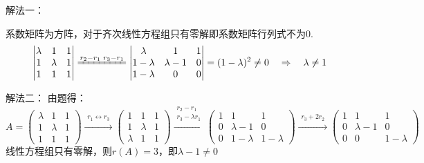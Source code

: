 \documentclass[a4paper]{report}
\begin{document}
\begin{jie}
解法一：

系数矩阵为方阵，对于齐次线性方程组只有零解即系数矩阵行列式不为0.
\begin{equation*}
\begin{vmatrix}
\lambda&1&1\\
1&\lambda&1\\
1&1&1
\end{vmatrix}\xlongequal{r_2-r_1\\ r_3-r_1}
\begin{vmatrix}
\lambda&1&1\\
1-\lambda&\lambda-1&0\\
1-\lambda&0&0
\end{vmatrix}=(1-\lambda)^2\neq 0~~~\Rightarrow~~~\lambda\neq1
\end{equation*}


解法二：
由题得：
\begin{equation*}
A=
\begin{pmatrix}
\lambda&1&1\\
1&\lambda&1\\
1&1&1
\end{pmatrix}
\xrightarrow{\substack{r_1\leftrightarrow r_3}}
{
\begin{pmatrix}
1&1&1\\
1&\lambda&1\\
\lambda&1&1
\end{pmatrix}
}\xrightarrow{\substack{r_2-r_1\\ r_3-\lambda r_1}}
{
\begin{pmatrix}
1&1&1\\
0&\lambda-1&0\\
0&1-\lambda&1-\lambda
\end{pmatrix}
}\xrightarrow{\substack{r_3+2r_2}}
{
\begin{pmatrix}
1&1&1\\
0&\lambda-1&0\\
0&0&1-\lambda
\end{pmatrix}
}
\end{equation*}
线性方程组只有零解，则$r(A)=3$，即$\lambda-1\neq 0$
\end{jie}
\end{document}
